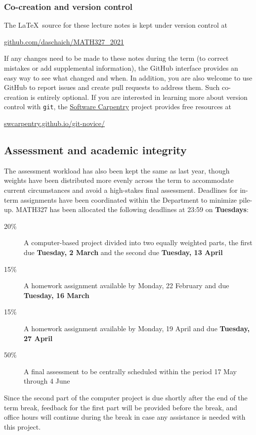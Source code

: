 \subsubsection*{Co-creation and version control}
The \LaTeX\ source for these lecture notes is kept under version control at \\
\centerline{\href{https://github.com/daschaich/MATH327_2021}{github.com/daschaich/MATH327\_2021}}
If any changes need to be made to these notes during the term (to correct mistakes or add supplemental information), the GitHub interface provides an easy way to see what changed and when.
In addition, you are also welcome to use GitHub to report issues and create pull requests to address them.
Such co-creation is entirely optional.
If you are interested in learning more about version control with \texttt{git}, the \href{https://software-carpentry.org}{Software Carpentry} project provides free resources at \\
\centerline{\href{https://swcarpentry.github.io/git-novice/}{swcarpentry.github.io/git-novice/}}



\subsection*{Assessment and academic integrity}
The assessment workload has also been kept the same as last year, though weights have been distributed more evenly across the term to accommodate current circumstances and avoid a high-stakes final assessment.
Deadlines for in-term assignments have been coordinated within the Department to minimize pile-up.
MATH327 has been allocated the following deadlines at 23:59 on \textbf{Tuesdays}:
\begin{description}
  \item[20\%] A computer-based project divided into two equally weighted parts, the first due \textbf{Tuesday, 2 March} and the second due \textbf{Tuesday, 13 April}
  \item[15\%] A homework assignment available by Monday, 22 February and due \textbf{Tuesday, 16 March}
  \item[15\%] A homework assignment available by Monday, 19 April and due \textbf{Tuesday, 27 April}
  \item[50\%] A final assessment to be centrally scheduled within the period 17 May through 4 June
\end{description}
Since the second part of the computer project is due shortly after the end of the term break, feedback for the first part will be provided before the break, and office hours will continue during the break in case any assistance is needed with this project.

